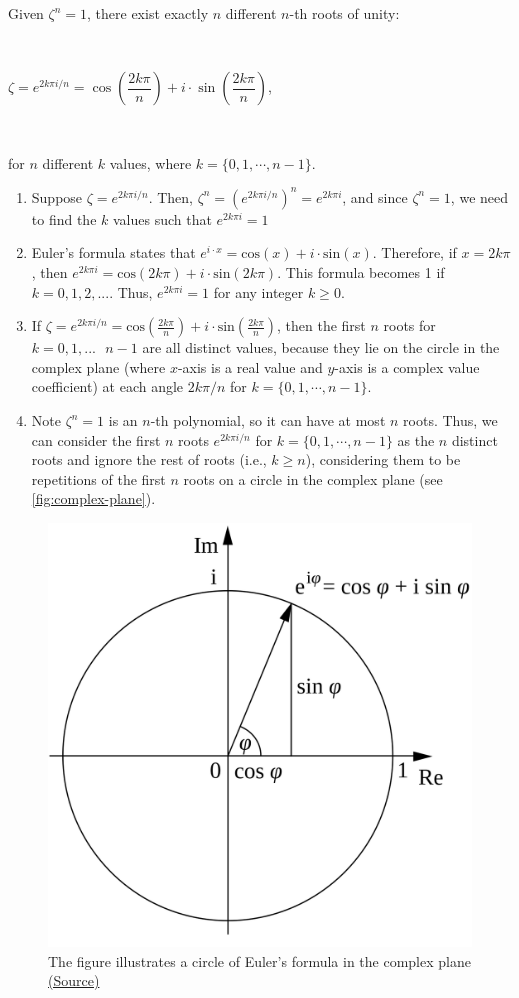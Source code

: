 \begin{tcolorbox}[title={\textbf{\tboxtheorem{\ref*{subsec:roots-theorem}.1} Formula for $\bm{n}$-th Root of Unity}}]
Given $\zeta^n = 1$, there exist exactly $n$ different $n$-th roots of unity: 

$ $

$\zeta = e^{2k\pi i/n} = \cos\left(\dfrac{2k\pi}{n}\right) + i\cdot\sin\left(\dfrac{2k\pi}{n}\right)$, 

$ $

\noindent for $n$ different $k$ values, where $k = \{0, 1, \cdots, n-1\}$.
\end{tcolorbox}
\begin{myproof} 
    \begin{enumerate}
    \item Suppose $\zeta = e^{2k\pi i/n}$. Then, $\zeta^n = (e^{2k\pi i/n})^n = e^{2k\pi i}$, and since $\zeta^n = 1$, we need to find the $k$ values such that $e^{2k\pi i} = 1$
    \item Euler's formula states that $e^{i\cdot x} = \text{cos}(x) + i \cdot \text{sin}(x)$. Therefore, if $x = 2k\pi$, then $e^{2k\pi i} = \text{cos}(2k\pi) + i \cdot \text{sin}(2k\pi)$. This formula becomes 1 if $k = 0, 1, 2, ...$. Thus, $e^{2k\pi i} = 1$ for any integer $k \geq 0$. 
    \item If $\zeta = e^{2k\pi i/n} = \text{cos}(\frac{2k\pi}{n}) + i\cdot\text{sin}(\frac{2k\pi}{n})$, then the first $n$ roots for $k = 0, 1, ... \text{ } n-1$ are all distinct values, because they lie on the circle in the complex plane (where $x$-axis is a real value and $y$-axis is a complex value coefficient) at each angle $2k\pi/n$ for $k = \{0, 1, \cdots, n-1\}$.
    \item Note $\zeta^n = 1$ is an $n$-th polynomial, so it can have at most $n$ roots. Thus, we can consider the first $n$ roots $e^{2k\pi i/n}$ for $k = \{0, 1, \cdots, n-1\}$ as the $n$ distinct roots and ignore the rest of roots (i.e., $k \geq n$), considering them to be repetitions of the first $n$ roots on a circle in the complex plane (see \autoref{fig:complex-plane}). 
    \end{enumerate}
\end{myproof}

\begin{figure}[h!]
    \centering
  \includegraphics[width=0.4\linewidth]{figures/euler-formula.png}
  \caption{The figure illustrates a circle of Euler's formula in the complex plane \href{https://en.wikipedia.org/wiki/Euler's_formula}{(Source)}}
  \label{fig:complex-plane}
\end{figure}


